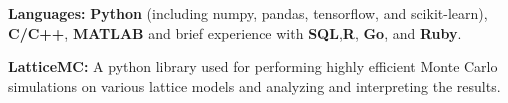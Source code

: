 \vspace{-1.75ex}


\begin{cvparagraph}

    \vspace{1.5ex}
    \begin{cvitems}
    \item {\textbf{Languages:} \textbf{Python} (including numpy, pandas,
            tensorflow, and scikit-learn), \textbf{C/C++}, \textbf{MATLAB} and
            brief experience with \textbf{SQL},\textbf{R}, \textbf{Go}, and
            \textbf{Ruby}.}
    \item {\textbf{LatticeMC:} A python library used for performing
            highly efficient Monte Carlo simulations on various lattice
            models and analyzing and interpreting the results.}
   \end{cvitems}

\end{cvparagraph}


